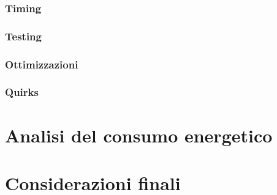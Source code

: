 \documentclass[a4paper]{article}
\begin{document}

\subsubsection{Timing}


\subsubsection{Testing}


\subsubsection{Ottimizzazioni}


\subsubsection{Quirks}


\section{Analisi del consumo energetico} %


\section{Considerazioni finali} %

\end{document}
